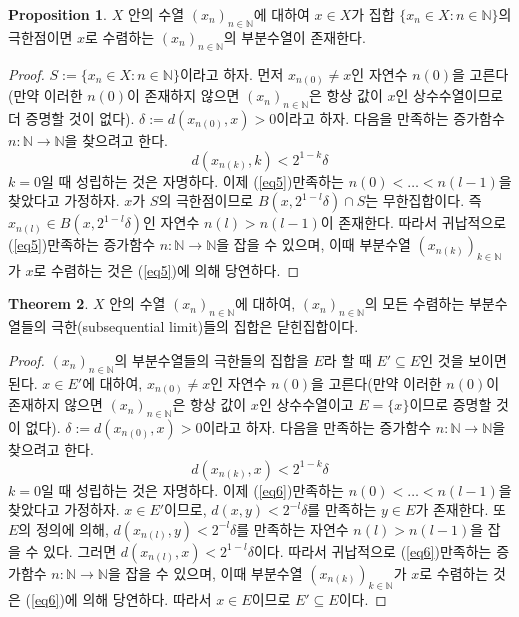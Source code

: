 \documentclass[11pt]{book}
\numberwithin{equation}{chapter}
\def\NN{\mathbb{N}}
\theoremstyle{definition}
\newtheorem{thm}{Theorem}[section]
\newtheorem{prop}[thm]{Proposition}
\begin{document}
\begin{prop} \label{prop 4.3.3}
    \(X\) 안의 수열 \((x_n)_{n \in \NN}\)에 대하여 \(x \in X\)가 집합 \(\{x_n \in X : n \in \NN\}\)의 극한점이면 \(x\)로 수렴하는 \((x_n)_{n \in \NN}\)의 부분수열이 존재한다.
\end{prop}
\begin{proof}
    \(S := \{x_n \in X : n \in \NN\}\)이라고 하자. 먼저 \(x_{n(0)} \ne x\)인 자연수 \(n(0)\)을 고른다(만약 이러한 \(n(0)\)이 존재하지 않으면 \((x_n)_{n \in \NN}\)은 항상 값이 \(x\)인 상수수열이므로 더 증명할 것이 없다). \(\delta := d(x_{n(0)}, x) > 0\)이라고 하자. 다음을 만족하는 증가함수 \(n : \NN \to \NN\)을 찾으려고 한다.
    \begin{equation} \label{eq5}
        d(x_{n(k)}, k) < 2^{1-k}\delta
    \end{equation}
    \(k = 0\)일 때 성립하는 것은 자명하다. 이제 (\ref{eq5})\를 만족하는 \(n(0) < \ldots < n(l-1)\)을 찾았다고 가정하자. \(x\)가 \(S\)의 극한점이므로 \(B(x, 2^{1-l} \delta) \cap S\)는 무한집합이다. 즉 \(x_{n(l)} \in B(x, 2^{1-l} \delta)\)인 자연수 \(n(l) > n(l-1)\)이 존재한다. 따라서 귀납적으로 (\ref{eq5})\를 만족하는 증가함수 \(n : \NN \to \NN\)을 잡을 수 있으며, 이때 부분수열 \((x_{n(k)})_{k \in \NN}\)가 \(x\)로 수렴하는 것은 (\ref{eq5})에 의해 당연하다. 
\end{proof}

\begin{thm}
    \(X\) 안의 수열 \((x_n)_{n \in \NN}\)에 대하여, \((x_n)_{n \in \NN}\)의 모든 수렴하는 부분수열들의 극한(subsequential limit)들의 집합은 닫힌집합이다.
\end{thm}
\begin{proof}
    \((x_n)_{n \in \NN}\)의 부분수열들의 극한들의 집합을 \(E\)라 할 때 \(E' \subseteq E\)인 것을 보이면 된다. \(x \in E'\)에 대하여, \(x_{n(0)} \ne x\)인 자연수 \(n(0)\)을 고른다(만약 이러한 \(n(0)\)이 존재하지 않으면 \((x_n)_{n \in \NN}\)은 항상 값이 \(x\)인 상수수열이고 \(E = \{x\}\)이므로 증명할 것이 없다). \(\delta := d(x_{n(0)}, x) > 0\)이라고 하자. 다음을 만족하는 증가함수 \(n : \NN \to \NN\)을 찾으려고 한다.
    \begin{equation} \label{eq6}
        d(x_{n(k)}, x) < 2^{1-k}\delta 
    \end{equation}
    \(k = 0\)일 때 성립하는 것은 자명하다. 이제 (\ref{eq6})\를 만족하는 \(n(0) < \ldots < n(l-1)\)을 찾았다고 가정하자. \(x \in E'\)이므로, \(d(x, y) < 2^{-l} \delta\)를 만족하는 \(y \in E\)가 존재한다. 또 \(E\)의 정의에 의해, \(d(x_{n(l)}, y) < 2^{-l} \delta\)를 만족하는 자연수 \(n(l) > n(l-1)\)을 잡을 수 있다. 그러면 \(d(x_{n(l)}, x) < 2^{1-l} \delta\)이다. 따라서 귀납적으로 (\ref{eq6})\를 만족하는 증가함수 \(n : \NN \to \NN\)을 잡을 수 있으며, 이때 부분수열 \((x_{n(k)})_{k \in \NN}\)가 \(x\)로 수렴하는 것은 (\ref{eq6})에 의해 당연하다. 따라서 \(x \in E\)이므로 \(E' \subseteq E\)이다.
\end{proof}
\end{document}
